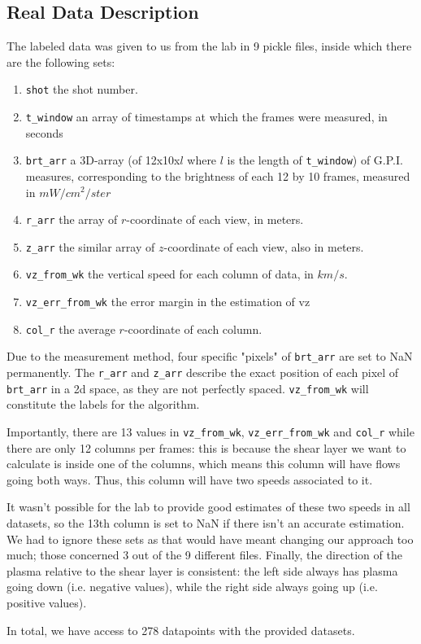 \documentclass[10pt,conference]{IEEEtran}
\begin{document}
\subsection{Real Data Description}
The labeled data was given to us from the lab in 9 pickle files, inside which there are the following sets:
\begin{enumerate}
  \item \texttt{shot} the shot number.
  \item \texttt{t\_window} an array of timestamps at which the frames were measured, in seconds
  \item \texttt{brt\_arr} a 3D-array (of 12x10x$l$ where $l$ is the length of \texttt{t\_window}) of G.P.I. measures, corresponding to the brightness of each 12 by 10 frames, measured in $mW/cm^2/ster$
  \item \texttt{r\_arr} the array of $r$-coordinate of each view, in meters.
  \item \texttt{z\_arr} the similar array of $z$-coordinate of each view, also in meters.
  \item \texttt{vz\_from\_wk} the vertical speed for each column of data, in $km/s$.
  \item \texttt{vz\_err\_from\_wk} the error margin in the estimation of vz
  \item \texttt{col\_r} the average $r$-coordinate of each column.
\end{enumerate}
Due to the measurement method, four specific "pixels" of \texttt{brt\_arr} are set to NaN permanently. The \texttt{r\_arr} and \texttt{z\_arr} describe the exact position of each pixel of \texttt{brt\_arr} in a 2d space, as they are not perfectly spaced. \texttt{vz\_from\_wk} will constitute the labels for the algorithm.\par
Importantly, there are 13 values in \texttt{vz\_from\_wk}, \texttt{vz\_err\_from\_wk} and \texttt{col\_r} while there are only 12 columns per frames: this is because the shear layer we want to calculate is inside one of the columns, which means this column will have flows going both ways. Thus, this column will have two speeds associated to it. \par
It wasn't possible for the lab to provide good estimates of these two speeds in all datasets, so the 13th column is set to NaN if there isn't an accurate estimation. We had to ignore these sets as that would have meant changing our approach too much; those concerned 3 out of the 9 different files.
Finally, the direction of the plasma relative to the shear layer is consistent: the left side always has plasma going down (i.e. negative values), while the right side always going up (i.e. positive values). \par
In total, we have access to 278 datapoints with the provided datasets.
\end{document}
